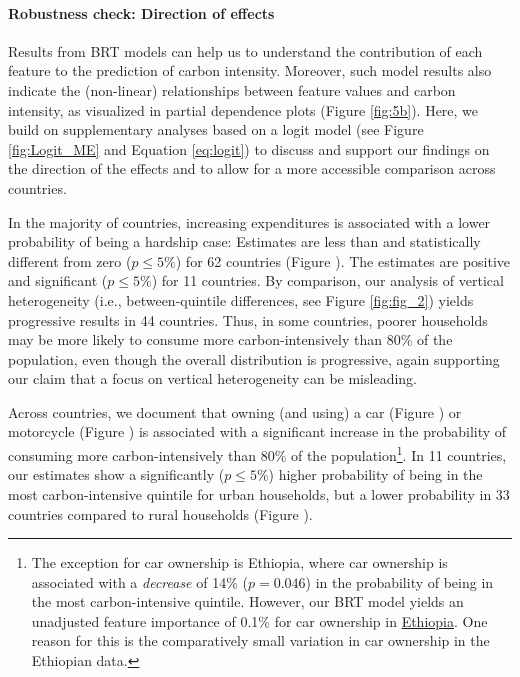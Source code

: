 \documentclass[12pt, a4paper]{article}
\begin{document}
\paragraph{Robustness check: Direction of effects}
Results from BRT models can help us to understand the contribution of each feature to the prediction of carbon intensity. Moreover, such model results also indicate the (non-linear) relationships between feature values and carbon intensity, as visualized in partial dependence plots (Figure \ref{fig:5b}). Here, we build on supplementary analyses based on a logit model (see Figure \ref{fig:Logit_ME} and Equation \ref{eq:logit}) to discuss and support our findings on the direction of the effects and to allow for a more accessible comparison across countries.

In the majority of countries, increasing expenditures is associated with a lower probability of being a hardship case: Estimates are less than and statistically different from zero ($p\leq 5\%$) for 62 countries (Figure ). The estimates are positive and significant ($p\leq 5\%$) for 11 countries. By comparison, our analysis of vertical heterogeneity (i.e., between-quintile differences, see Figure \ref{fig:fig_2}) yields progressive results in 44 countries. Thus, in some countries, poorer households may be more likely to consume more carbon-intensively than 80\% of the population, even though the overall distribution is progressive, again supporting our claim that a focus on vertical heterogeneity can be misleading.

Across countries, we document that owning (and using) a car (Figure ) or motorcycle (Figure ) is associated with a significant increase in the probability of consuming more carbon-intensively than 80\% of the population\footnote{The exception for car ownership is Ethiopia, where car ownership is associated with a \textit{decrease} of 14\% ($p=0.046$) in the probability of being in the most carbon-intensive quintile. However, our BRT model yields an unadjusted feature importance of 0.1\% for car ownership in \hyperref[fig:5b_ETH]{Ethiopia}. One reason for this is the comparatively small variation in car ownership in the Ethiopian data.}. In 11 countries, our estimates show a significantly ($p\leq 5\%$) higher probability of being in the most carbon-intensive quintile for urban households, but a lower probability in 33 countries compared to rural households (Figure ).
\end{document}
